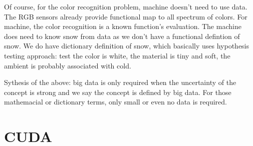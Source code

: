 \documentclass{article}
\numberwithin{equation}{subsection}
\begin{document}
	Of course, for the color recognition problem, machine doesn't need to use data. The RGB sensors already provide functional map to all spectrum of colors. For machine, the color recognition is a known function's evaluation. The machine does need to know snow from data as we don't have a functional defintion of snow. We do have dictionary definition of snow, which basically uses hypothesis testing approach: test the color is white, the material is tiny and soft, the ambient is probably associated with cold.
	
	Sythesis of the above: big data is only required when the uncertainty of the concept is strong and we say the concept is defined by big data. For those mathemacial or dictionary terms, only small or even no data is required.
	\section{CUDA}
\end{document}
